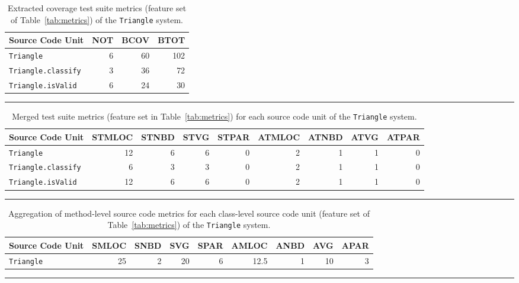 \begin{landscape}
	\begin{table}[h]
 	 \centering
 	 \begin{tabular}{|l|r|r|r|}
 	   \hline
 	   \rowcolor[RGB]{169,196,223}
 	   \textbf{Source Code Unit} & \textbf{NOT} & \textbf{BCOV} & \textbf{BTOT} \\
 	   \hline \texttt{Triangle} & 6 & 60 & 102 \\
 	   \hline \texttt{Triangle.classify} & 3 & 36 & 72 \\
 	   \hline \texttt{Triangle.isValid} & 6 & 24 & 30 \\
 	   \hline
 	 \end{tabular}
 	 \caption{Extracted coverage test suite metrics (feature set  of Table~\ref{tab:metrics}) of the \texttt{Triangle} system.}
 	 \vspace{2mm}
 	 \hrule
 	 \label{tab:triangle_coverage_metrics}
	\end{table}

  \begin{table}[h]
    \centering
    \begin{tabular}{|l|r|r|r|r|r|r|r|r|}
      \hline
      \rowcolor[RGB]{169,196,223}
      \textbf{Source Code Unit} & \textbf{STMLOC} & \textbf{STNBD} & \textbf{STVG} & \textbf{STPAR} & \textbf{ATMLOC} & \textbf{ATNBD} & \textbf{ATVG} & \textbf{ATPAR}  \\
      \hline \texttt{Triangle} & 12 & 6 & 6 & 0 & 2 & 1 & 1 & 0 \\
      \hline \texttt{Triangle.classify} & 6 & 3 & 3 & 0 & 2 & 1 & 1 & 0 \\
      \hline \texttt{Triangle.isValid} & 12 & 6 & 6 & 0 & 2 & 1 & 1 & 0 \\
      \hline
    \end{tabular}
    \caption{Merged test suite metrics (feature set  in Table~\ref{tab:metrics}) for each source code unit of the \texttt{Triangle} system.}
    \vspace{2mm}
    \hrule
    \label{tab:triangle_merge_test_metrics}
  \end{table}

  \begin{table}[h]
    \centering
    \begin{tabular}{|l|r|r|r|r|r|r|r|r|}
      \hline
      \rowcolor[RGB]{169,196,223}
      \textbf{Source Code Unit} & \textbf{SMLOC} & \textbf{SNBD} & \textbf{SVG} & \textbf{SPAR} & \textbf{AMLOC} & \textbf{ANBD} & \textbf{AVG} & \textbf{APAR}  \\
      \hline \texttt{Triangle} & 25 & 2 & 20 & 6 & 12.5 & 1 & 10 & 3 \\
      \hline
    \end{tabular}
    \caption{Aggregation of method-level source code metrics for each class-level source code unit (feature set  of Table~\ref{tab:metrics}) of the \texttt{Triangle} system.}
    \vspace{2mm}
    \hrule
    \label{tab:triangle_aggregate_metrics}
  \end{table}
\end{landscape}


